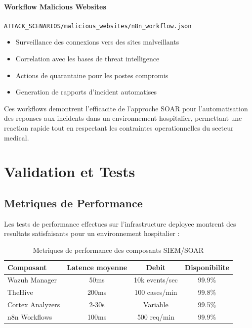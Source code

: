 \paragraph{Workflow Malicious Websites}
\texttt{ATTACK\_SCENARIOS/malicious\_websites/n8n\_workflow.json}
\begin{itemize}
  \item Surveillance des connexions vers des sites malveillants
  \item Correlation avec les bases de threat intelligence
  \item Actions de quarantaine pour les postes compromis
  \item Generation de rapports d'incident automatises
\end{itemize}

Ces workflows demontrent l'efficacite de l'approche SOAR pour l'automatisation des reponses aux incidents dans un environnement hospitalier, permettant une reaction rapide tout en respectant les contraintes operationnelles du secteur medical.

\section{Validation et Tests}

\subsection{Metriques de Performance}

Les tests de performance effectues sur l'infrastructure deployee montrent des resultats satisfaisants pour un environnement hospitalier :

\begin{table}[H]
  \centering
  \caption{Metriques de performance des composants SIEM/SOAR}
  \begin{tabular}{|l|c|c|c|}
    \hline
    \textbf{Composant} & \textbf{Latence moyenne} & \textbf{Debit} & \textbf{Disponibilite} \\
    \hline
    Wazuh Manager      & 50ms                     & 10k events/sec & 99.9\%                 \\
    \hline
    TheHive            & 200ms                    & 100 cases/min  & 99.8\%                 \\
    \hline
    Cortex Analyzers   & 2-30s                    & Variable       & 99.5\%                 \\
    \hline
    n8n Workflows      & 100ms                    & 500 req/min    & 99.9\%                 \\
    \hline
  \end{tabular}
\end{table}

